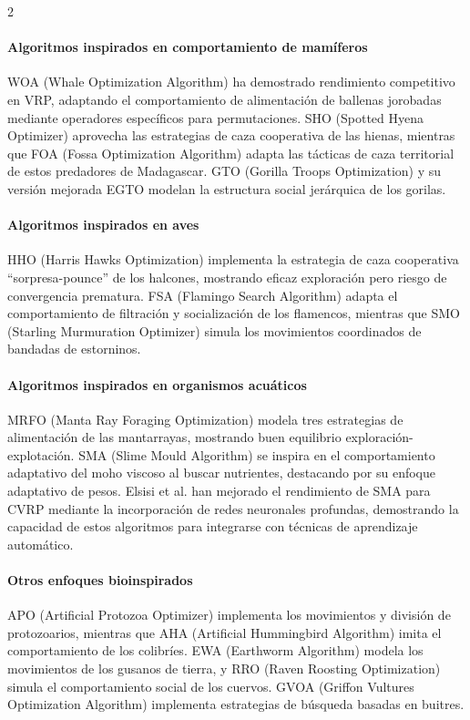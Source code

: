 \documentclass[10pt,a4paper]{extarticle}
\begin{document}
{\begin{multicols}{2}
\paragraph{Algoritmos inspirados en comportamiento de mamíferos} WOA (Whale Optimization Algorithm) \cite{Mirjalili2016WOA} ha demostrado rendimiento competitivo en VRP, adaptando el comportamiento de alimentación de ballenas jorobadas mediante operadores específicos para permutaciones. SHO (Spotted Hyena Optimizer) \cite{Mirjalili2017SHO} aprovecha las estrategias de caza cooperativa de las hienas, mientras que FOA (Fossa Optimization Algorithm) \cite{Hamadneh2024FOA} adapta las tácticas de caza territorial de estos predadores de Madagascar. GTO (Gorilla Troops Optimization) \cite{Abdollahzadeh2021GTO} y su versión mejorada EGTO \cite{Hassan2024EGTO} modelan la estructura social jerárquica de los gorilas.

\paragraph{Algoritmos inspirados en aves} HHO (Harris Hawks Optimization) \cite{Heidari2019HHO} implementa la estrategia de caza cooperativa ``sorpresa-pounce'' de los halcones, mostrando eficaz exploración pero riesgo de convergencia prematura. FSA (Flamingo Search Algorithm) \cite{Wang2021FSA} adapta el comportamiento de filtración y socialización de los flamencos, mientras que SMO (Starling Murmuration Optimizer) \cite{Zamani2022SMO} simula los movimientos coordinados de bandadas de estorninos.

\paragraph{Algoritmos inspirados en organismos acuáticos} MRFO (Manta Ray Foraging Optimization) \cite{Zhao2020MRFO} modela tres estrategias de alimentación de las mantarrayas, mostrando buen equilibrio exploración-explotación. SMA (Slime Mould Algorithm) \cite{Li2020SMA} se inspira en el comportamiento adaptativo del moho viscoso al buscar nutrientes, destacando por su enfoque adaptativo de pesos. Elsisi et al. \cite{Elsisi2023DNN} han mejorado el rendimiento de SMA para CVRP mediante la incorporación de redes neuronales profundas, demostrando la capacidad de estos algoritmos para integrarse con técnicas de aprendizaje automático.

\paragraph{Otros enfoques bioinspirados} APO (Artificial Protozoa Optimizer) \cite{Wang2024APO} implementa los movimientos y división de protozoarios, mientras que AHA (Artificial Hummingbird Algorithm) \cite{Zhao2022AHA} imita el comportamiento de los colibríes. EWA (Earthworm Algorithm) \cite{Wang2018EWA} modela los movimientos de los gusanos de tierra, y RRO (Raven Roosting Optimization) \cite{Brabazon2016RRO} simula el comportamiento social de los cuervos. GVOA (Griffon Vultures Optimization Algorithm) \cite{Hasan2025GVOA} implementa estrategias de búsqueda basadas en buitres.


\end{multicols}}
\end{document}
